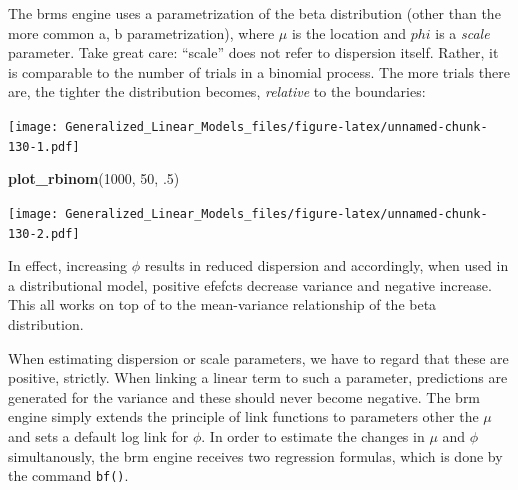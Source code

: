 \documentclass[]{svmono}
\newenvironment{Shaded}{\begin{snugshade}}{\end{snugshade}}
\newcommand{\KeywordTok}[1]{\textcolor[rgb]{0.13,0.29,0.53}{\textbf{#1}}}
\newcommand{\DataTypeTok}[1]{\textcolor[rgb]{0.13,0.29,0.53}{#1}}
\newcommand{\DecValTok}[1]{\textcolor[rgb]{0.00,0.00,0.81}{#1}}
\newcommand{\StringTok}[1]{\textcolor[rgb]{0.31,0.60,0.02}{#1}}
\newcommand{\ControlFlowTok}[1]{\textcolor[rgb]{0.13,0.29,0.53}{\textbf{#1}}}
\newcommand{\OperatorTok}[1]{\textcolor[rgb]{0.81,0.36,0.00}{\textbf{#1}}}
\newcommand{\NormalTok}[1]{#1}
\theoremstyle{definition}
\theoremstyle{definition}
\theoremstyle{definition}
\theoremstyle{remark}
\begin{document}
The brms engine uses a parametrization of the beta distribution (other
than the more common a, b parametrization), where \(\mu\) is the
location and \(phi\) is a \emph{scale} parameter. Take great care:
``scale'' does not refer to dispersion itself. Rather, it is comparable
to the number of trials in a binomial process. The more trials there
are, the tighter the distribution becomes, \emph{relative} to the
boundaries:

\begin{Shaded}
\end{Shaded}

\texttt{[image: Generalized\_Linear\_Models\_files/figure-latex/unnamed-chunk-130-1.pdf]}

\begin{Shaded}
\begin{Highlighting}[]
\KeywordTok{plot_rbinom}\NormalTok{(}\DecValTok{1000}\NormalTok{, }\DecValTok{50}\NormalTok{, .}\DecValTok{5}\NormalTok{)}
\end{Highlighting}
\end{Shaded}

\texttt{[image: Generalized\_Linear\_Models\_files/figure-latex/unnamed-chunk-130-2.pdf]}

In effect, increasing \(\phi\) results in reduced dispersion and
accordingly, when used in a distributional model, positive efefcts
decrease variance and negative increase. This all works on top of to the
mean-variance relationship of the beta distribution.

When estimating dispersion or scale parameters, we have to regard that
these are positive, strictly. When linking a linear term to such a
parameter, predictions are generated for the variance and these should
never become negative. The brm engine simply extends the principle of
link functions to parameters other the \(\mu\) and sets a default log
link for \(\phi\). In order to estimate the changes in \(\mu\) and
\(\phi\) simultanously, the brm engine receives two regression formulas,
which is done by the command \texttt{bf()}.
\end{document}
